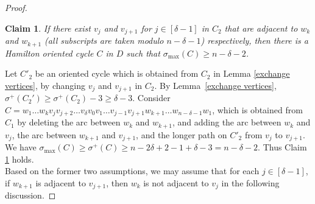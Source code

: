 \documentclass[11pt]{article}
\newtheorem{claim}{Claim}
\newcommand{\2}{\vspace{0.2cm}}
\begin{document}
\begin{proof}
 \begin{claim}\label{claim:2.2-3}
     If there exist $v_{j}$ and $v_{j+1}$ for $j\in [\delta-1]$ in $C_2$ that are adjacent to $w_{k}$ and $w_{k+1}$ (all subscripts are taken modulo $n-\delta-1$) respectively, then there is a Hamilton oriented cycle $C$ in $D$ such that $\sigma_{\max}(C) \ge n-\delta-2$.
 \end{claim}
   Let $C'_2$ be an oriented cycle which is obtained from $C_2$ in Lemma \ref{exchange vertices}, by changing $v_{j}$ and $v_{j+1}$ in $C_2$. By Lemma~\ref{exchange vertices}, $\sigma^+(C_2')\ge \sigma^+(C_2)-3\ge \delta - 3$. Consider $C = w_1\ldots w_k v_{j}v_{j+2} \ldots v_{\delta} v_0 v_1\dots v_{j-1}v_{j+1} w_{k+1} \ldots w_{n-\delta-1}w_1$, which is obtained from $C_1$ by deleting the arc between $w_k$ and $w_{k+1}$, and adding the arc between $w_k$ and $v_{j}$, the arc between $w_{k+1}$ and $v_{j+1}$, and the longer path on $C'_2$ from $v_{j}$ to $v_{j+1}$. We have $\sigma_{\max}(C) \ge \sigma^+(C)\ge n-2\delta +2 - 1 + \delta -3=n-\delta -2$. Thus Claim \ref{claim:2.2-3} holds.\\

   Based on the former two assumptions, we may assume that for each $j\in [\delta-1]$, if $w_{k+1}$ is adjacent to $v_{j+1}$, then $w_{k}$ is not adjacent to $v_j$ in the following discussion.


\end{proof}
\end{document}
